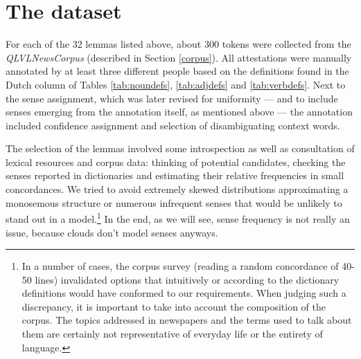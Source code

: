 \documentclass[
]{book}
\begin{document}
\hypertarget{extraction}{%
\section{The dataset}\label{extraction}}

For each of the 32 lemmas listed above, about 300 tokens were collected from the \emph{QLVLNewsCorpus} (described in Section \ref{corpus}). All attestations were manually annotated by at least three different people based on the definitions found in the Dutch column of Tables \ref{tab:noundefs}, \ref{tab:adjdefs} and \ref{tab:verbdefs}. Next to the sense assignment, which was later revised for uniformity --- and to include senses emerging from the annotation itself, as mentioned above --- the annotation included confidence assignment and selection of disambiguating context words.

The selection of the lemmas involved some introspection as well as consultation of lexical resources and corpus data: thinking of potential candidates, checking the senses reported in dictionaries \autocite{vandale_groot,vandale_klein} and estimating their relative frequencies in small concordances. We tried to avoid extremely skewed distributions approximating a monosemous structure or numerous infrequent senses that would be unlikely to stand out in a model.\footnote{In a number of cases, the corpus survey (reading a random concordance of 40-50 lines) invalidated options that intuitively or according to the dictionary definitions would have conformed to our requirements. When judging such a discrepancy, it is important to take into account the composition of the corpus. The topics addressed in newspapers and the terms used to talk about them are certainly not representative of everyday life or the entirety of language.} In the end, as we will see, sense frequency is not really an issue, because clouds don't model senses anyways.
\end{document}
